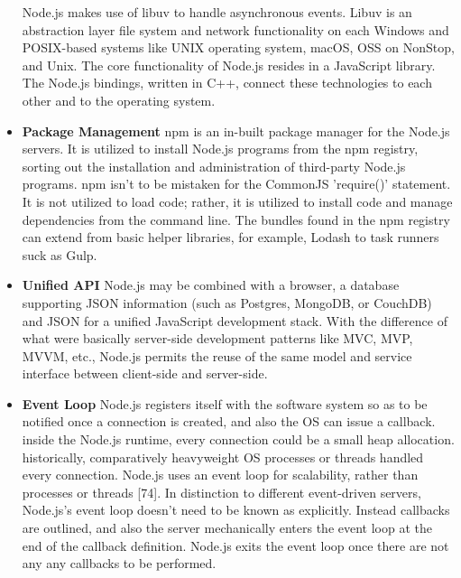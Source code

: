 \documentclass[../thesis.tex]{subfiles}
\begin{document}
\begin{itemize}
    \vspace{5mm}
    Node.js makes use of libuv to handle asynchronous events. Libuv is an abstraction layer file system and network functionality on each Windows and POSIX-based systems like UNIX operating system, macOS, OSS on NonStop, and Unix.
    \vspace{5mm}
    The core functionality of Node.js resides in a JavaScript library. The Node.js bindings, written in C++, connect these technologies to each other and to the operating system.
    \vspace{5mm}
    \item \textbf{Package Management}
    \vspace{5mm}
    npm is an in-built package manager for the Node.js servers. It is utilized to install Node.js programs from the npm registry, sorting out the installation and administration of third-party Node.js programs. npm isn't to be mistaken for the CommonJS 'require()' statement. It is not utilized to load code; rather, it is utilized to install code and manage dependencies from the command line. The bundles found in the npm registry can extend from basic helper libraries, for example, Lodash to task runners suck as Gulp.
    \vspace{5mm}
    \item \textbf{Unified API}
    \vspace{5mm}
    Node.js may be combined with a browser, a database supporting JSON information (such as Postgres, MongoDB, or CouchDB) and JSON for a unified JavaScript development stack. With the difference of what were basically server-side development patterns like MVC, MVP, MVVM, etc., Node.js permits the reuse of the same model and service interface between client-side and server-side.
    \vspace{5mm}
    \item \textbf{Event Loop}
    \vspace{5mm}
    Node.js registers itself with the software system so as to be notified once a connection is created, and also the OS can issue a callback. inside the Node.js runtime, every connection could be a small heap allocation. historically, comparatively heavyweight OS processes or threads handled every connection. Node.js uses an event loop for scalability, rather than processes or threads [74]. In distinction to different event-driven servers, Node.js's event loop doesn't need to be known as explicitly. Instead callbacks are outlined, and also the server mechanically enters the event loop at the end of the callback definition. Node.js exits the event loop once there are not any any callbacks to be performed.

\end{itemize}
\end{document}
